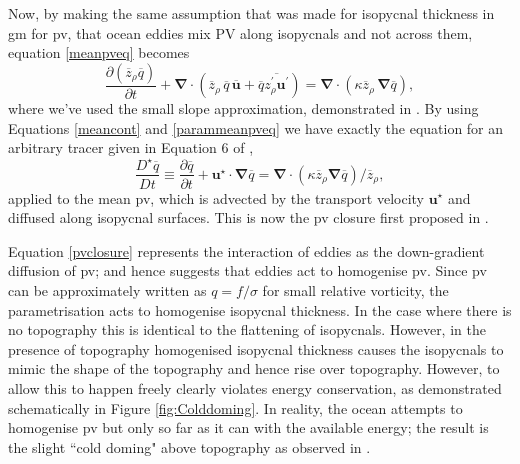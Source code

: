\documentclass[10pt,a4paper]{article}
\newcommand*\mean[1]{\overline{#1}}
\newcommand*\res[1]{{#1}^{\prime}}
\begin{document}
                Now, by making the same assumption that was made for isopycnal thickness in 
                \gls{gm} for \gls{pv}, that ocean eddies mix PV along isopycnals and not
                across them, equation \ref{meanpveq} becomes
                \begin{equation}
                \frac{\partial \left(\mean{z}_{\rho} \mean{q}\right)}{\partial t} +
                \boldsymbol{\nabla}\cdot\left(\mean{z}_{\rho}\,\mean{q}\,\mean{\boldsymbol{u}}+\mean{q}\mean{\res{z}_{\rho} \res{\boldsymbol{u}}}\right)
                = \boldsymbol{\nabla}\cdot\left(\kappa \mean{z}_{\rho}\,\boldsymbol{\nabla}\mean{q}\right) ,
                \label{parammeanpveq}
                \end{equation}
                where we've used the small slope approximation, demonstrated in \cite{gent1990}. By using Equations \ref{meancont} and \ref{parammeanpveq} we have exactly the equation for an arbitrary tracer given in Equation 6 of \cite{gent1995parameterizing},
                \begin{equation}
                \frac{D^\star \mean{q}}{D t}\equiv\frac{\partial \mean{q}}{\partial t} + \boldsymbol{u}^\star\cdot\boldsymbol{\nabla}\mean{q} = \boldsymbol{\nabla}\cdot
                \left(\kappa \mean{z}_{\rho}\boldsymbol{\nabla} \mean{q} \right)/\mean{z}_{\rho} ,
                \label{pvclosure}
                \end{equation}
                applied to the mean \gls{pv}, which is advected by the transport velocity $\boldsymbol{u}^\star$ and diffused along isopycnal surfaces. This is now
                the \gls{pv} closure first proposed in \cite{greatbatch1998exploring}.
                
                Equation \ref{pvclosure} represents the interaction of eddies as the
                down-gradient diffusion of \gls{pv}; and hence suggests that eddies
                act to homogenise \gls{pv}. Since \gls{pv} can be approximately written
                as $q=f/\sigma$ for small relative vorticity, the parametrisation acts  to homogenise isopycnal thickness. In the case 
                where there is no topography this is identical to the flattening of isopycnals.
                However, in the presence of topography homogenised isopycnal thickness
                causes the isopycnals to mimic the shape of the topography and hence 
                rise over topography. However, to allow this to happen freely
                clearly violates energy conservation, as demonstrated schematically in 
                Figure \ref{fig:Colddoming}. In reality, the ocean attempts to 
                homogenise \gls{pv} but only so far as it can with the available energy;
                the result is the slight ``cold doming" above topography as observed in
                \cite{adcock2000interactions}. 
                
\end{document}
